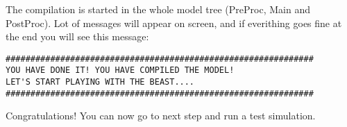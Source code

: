 The compilation is started in the whole model tree (PreProc, Main and PostProc).
Lot of messages will appear on screen, and if everithing goes fine at the end
you will see this message:

\begin{Verbatim}
##############################################################
YOU HAVE DONE IT! YOU HAVE COMPILED THE MODEL!
LET'S START PLAYING WITH THE BEAST....                        
##############################################################
\end{Verbatim}

Congratulations! You can now go to next step and run a test simulation.
